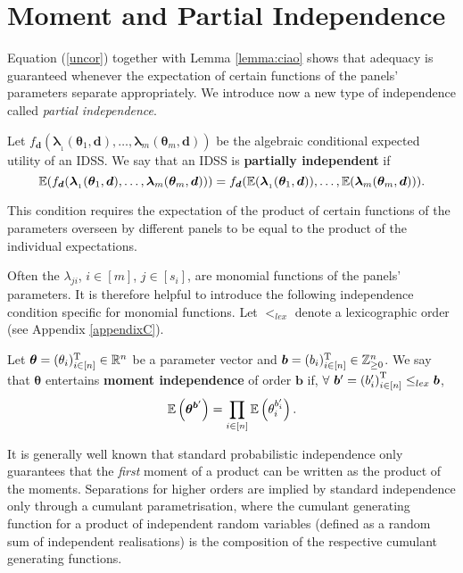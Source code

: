 \section{Moment and Partial Independence}
\label{sec:momind}
Equation (\ref{uncor}) together with Lemma \ref{lemma:ciao} shows that adequacy is guaranteed whenever the expectation of certain functions of the panels' parameters separate appropriately. We introduce now a new type of independence called \textit{partial independence}.
\begin{definition}
\label{def:partial}
Let $f_{\bm{d}}(\bm{\lambda }_{_{1}}(\bm{\theta }_{1},\bm{d}),\dots,\bm{\lambda }_{m}(\bm{\theta }_{m},\bm{d}))$ be the algebraic conditional expected utility of an IDSS. We say that an IDSS is \textbf{partially independent} if 
\begin{equation*}
\mathbb{E}(f_{\bm{d}}(\bm{\lambda }_{_{1}}(\bm{\theta }_{1},\bm{d}),\dots,\bm{\lambda }_{m}(\bm{\theta }_{m},\bm{d})))=f_{\bm{d}}(\mathbb{E}(\bm{\lambda }_{_{1}}(\bm{\theta }_{1},\bm{d})),\dots,\mathbb{E}(\bm{\lambda }_{m}(\bm{\theta }_{m},\bm{d}))).
\end{equation*}
\end{definition}
This condition requires the expectation of the product of certain functions of the parameters overseen by different panels to be equal to the product of the individual expectations.

Often the $\lambda_{ji}$, $i\in[m]$, $j\in[s_i]$, are monomial functions of the panels' parameters. It is therefore helpful to introduce the following independence condition specific for monomial functions. Let $<_{lex}$ denote a lexicographic order (see Appendix \ref{appendixC}).

\begin{definition}
\label{def:moment}
Let $\bm{\theta}=(\theta_i)^{\textnormal{T}}_{i\in[n]}\in\mathbb{R}^{n}$ be a parameter vector and $\bm{b}=(b_i)^{\textnormal{T}}_{i\in[n]}\in\mathbb{Z}^n_{\geq 0}$. We say that $\bm{\theta}$ entertains \textbf{moment independence} of order $\bm{b}$ if,  $\forall~\bm{b}'=\left(b_i'\right)_{i\in[n]}^{\textnormal{T}}\leq_{lex} \bm{b}$, 
\begin{equation*}
\mathbb{E}\left(\bm{\theta}^{\bm{b}'}\right)=\prod_{i\in[n]}\mathbb{E}\left(\theta_i^{b_i'}\right).
\end{equation*}
\end{definition}

It is generally well known that standard probabilistic independence only guarantees that the \textit{first} moment of a product can be written as the product of the moments. Separations for higher orders are implied by standard independence only through a cumulant parametrisation, where the cumulant generating function for a product of independent random variables (defined as a random sum of independent realisations) is the composition of the respective cumulant generating functions.

